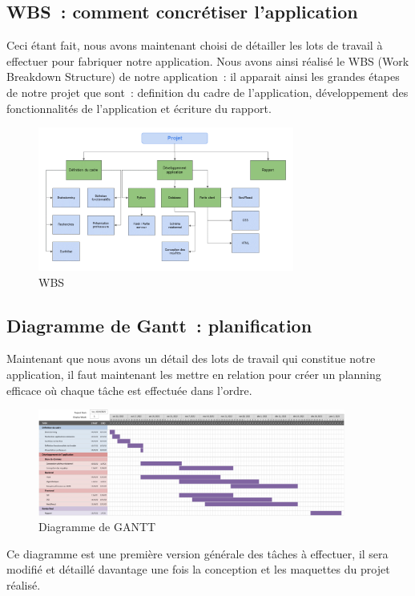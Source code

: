 \documentclass[french,a4paper]{article}
\begin{document}
\subsection{WBS~: comment concrétiser l’application}
Ceci étant fait, nous avons maintenant choisi de détailler les lots de travail à effectuer pour fabriquer notre application. Nous avons ainsi réalisé le WBS (Work Breakdown Structure) de notre application~: il apparait ainsi les grandes étapes de notre projet que sont~: definition du cadre de l’application, développement des fonctionnalités de l’application et écriture du rapport.
\begin{figure}[H]
    \centering
    \includegraphics[width=0.75\textwidth]{img/WBS.png}
    \caption{WBS}
\end{figure} 

\subsection{Diagramme de Gantt~: planification}
Maintenant que nous avons un détail des lots de travail qui constitue notre application, il faut maintenant les mettre en relation pour créer un planning efficace où chaque tâche est effectuée dans l’ordre.
\begin{figure}[H]
    \centering
    \includegraphics[width=0.9\textwidth]{img/gantt.png}
    \caption{Diagramme de GANTT}
\end{figure} 
Ce diagramme est une première version générale des tâches à effectuer, il sera modifié et détaillé davantage une fois la conception et les maquettes du projet réalisé.
\end{document}
